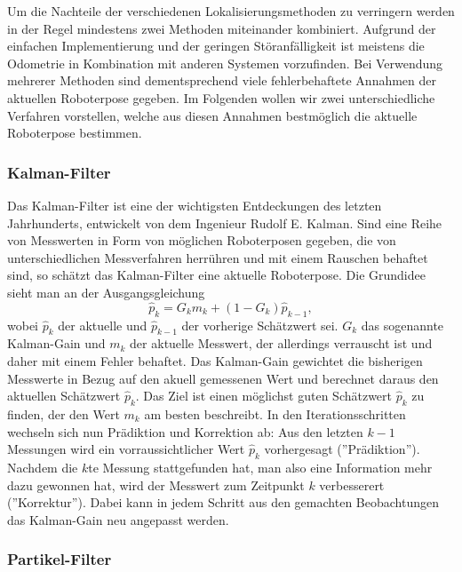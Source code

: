Um die Nachteile der verschiedenen Lokalisierungsmethoden zu
 verringern werden in der Regel mindestens zwei Methoden miteinander
 kombiniert. Aufgrund der einfachen Implementierung und der geringen
 Störanfälligkeit ist meistens die Odometrie in Kombination mit
 anderen Systemen vorzufinden. Bei Verwendung mehrerer Methoden sind
 dementsprechend viele fehlerbehaftete Annahmen der aktuellen
 Roboterpose gegeben. Im Folgenden wollen wir zwei unterschiedliche
 Verfahren vorstellen, welche aus diesen Annahmen bestmöglich die
 aktuelle Roboterpose bestimmen.
 
\subsubsection{Kalman-Filter}

Das Kalman-Filter ist eine der wichtigsten Entdeckungen des letzten Jahrhunderts, entwickelt von dem Ingenieur Rudolf E. Kalman.
Sind eine Reihe von Messwerten in Form von möglichen Roboterposen gegeben, die von unterschiedlichen Messverfahren herrühren und mit einem Rauschen behaftet sind, so schätzt das Kalman-Filter eine aktuelle Roboterpose.
Die Grundidee sieht man an der Ausgangsgleichung \[ \hat{p}_k = G_k m_k + (1-G_k) \hat{p}_{k-1}, \] wobei \(\hat{p}_k\) der aktuelle und  \(\hat{p}_{k-1}\) der vorherige Schätzwert sei. \(G_k\) das sogenannte Kalman-Gain und \(m_k\) der aktuelle Messwert, der allerdings verrauscht ist und daher mit einem Fehler behaftet. Das Kalman-Gain gewichtet die bisherigen Messwerte in Bezug auf den akuell gemessenen Wert und berechnet daraus den aktuellen Schätzwert \(\hat{p}_k\). Das Ziel ist einen möglichst guten Schätzwert \(\hat{p}_k\) zu finden, der den Wert \(m_k\) am besten beschreibt.
In den Iterationsschritten wechseln sich nun Prädiktion und Korrektion ab: Aus den letzten \(k-1\) Messungen wird ein vorraussichtlicher Wert \(\hat{p}_k\) vorhergesagt (''Prädiktion''). Nachdem die \(k\)te Messung stattgefunden hat, man also eine Information mehr dazu gewonnen hat, wird der Messwert zum Zeitpunkt \(k\) verbesserert (''Korrektur''). Dabei kann in jedem Schritt aus den gemachten Beobachtungen das Kalman-Gain neu angepasst werden.

\subsubsection{Partikel-Filter}

